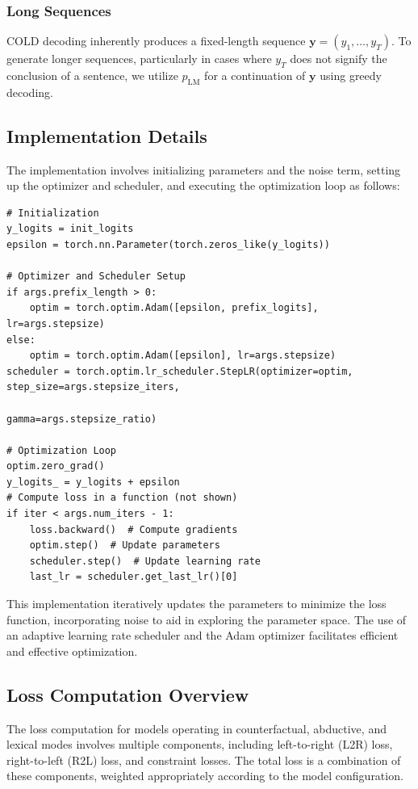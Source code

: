 \documentclass{article}
\begin{document}
\subsubsection*{Long Sequences}
COLD decoding inherently produces a fixed-length sequence \(\mathbf{y} = (y_1, \ldots, y_T)\). To generate longer sequences, particularly in cases where \(y_T\) does not signify the conclusion of a sentence, we utilize \(p_{\text{LM}}\) for a continuation of \(\mathbf{y}\) using greedy decoding.

\subsection{Implementation Details}

The implementation involves initializing parameters and the noise term, setting up the optimizer and scheduler, and executing the optimization loop as follows:

\begin{verbatim}
# Initialization
y_logits = init_logits
epsilon = torch.nn.Parameter(torch.zeros_like(y_logits))

# Optimizer and Scheduler Setup
if args.prefix_length > 0:
    optim = torch.optim.Adam([epsilon, prefix_logits], lr=args.stepsize)
else:
    optim = torch.optim.Adam([epsilon], lr=args.stepsize)
scheduler = torch.optim.lr_scheduler.StepLR(optimizer=optim, step_size=args.stepsize_iters,
                                             gamma=args.stepsize_ratio)

# Optimization Loop
optim.zero_grad()
y_logits_ = y_logits + epsilon
# Compute loss in a function (not shown)
if iter < args.num_iters - 1:
    loss.backward()  # Compute gradients
    optim.step()  # Update parameters
    scheduler.step()  # Update learning rate
    last_lr = scheduler.get_last_lr()[0]
\end{verbatim}


This implementation iteratively updates the parameters to minimize the loss function, incorporating noise to aid in exploring the parameter space. The use of an adaptive learning rate scheduler and the Adam optimizer facilitates efficient and effective optimization.

\subsection{Loss Computation Overview}

The loss computation for models operating in counterfactual, abductive, and lexical modes involves multiple components, including left-to-right (L2R) loss, right-to-left (R2L) loss, and constraint losses. The total loss is a combination of these components, weighted appropriately according to the model configuration.
\end{document}

